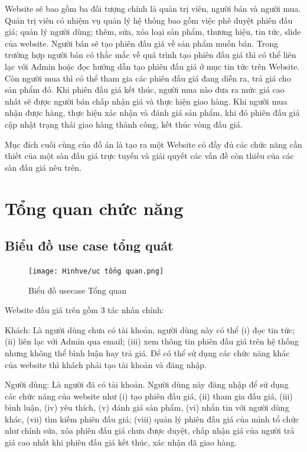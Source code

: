 \documentclass[../DoAn.tex]{subfiles}
\begin{document}
Website sẽ bao gồm ba đối tượng chính là quản trị viên, người bán và người mua. Quản trị viên có nhiệm vụ quản lý hệ thống bao gồm việc phê duyệt phiên đấu giá; quản lý người dùng; thêm, sửa, xóa loại sản phẩm, thương hiệu, tin tức, slide của website. Người bán sẽ tạo phiên đấu giá về sản phẩm muốn bán. Trong trường hợp người bán có thắc mắc về quá trình tạo phiên đấu giá thì có thể liên lạc với Admin hoặc đọc hướng dẫn tạo phiên đấu giá ở mục tin tức trên Website. Còn người mua thì có thể tham gia các phiên đấu giá đang diễn ra, trả giá cho sản phẩm đó. Khi phiên đấu giá kết thúc, người mua nào đưa ra mức giá cao nhất sẽ được người bán chấp nhận giá và thực hiện giao hàng. Khi người mua nhận được hàng, thực hiện xác nhận và đánh giá sản phẩm, khi đó phiên đấu giá cập nhật trạng thái giao hàng thành công, kết thúc vòng đấu giá.

Mục đích cuối cùng của đồ án là tạo ra một Website có đầy đủ các chức năng cần thiết của một sàn đấu giá trực tuyến và giải quyết các vấn đề còn thiếu của các sàn đấu giá nêu trên.
\section{Tổng quan chức năng}
\label{section:2.2}
\subsection{Biểu đồ use case tổng quát}
\label{subsection:2.2.1}
\begin{figure}[H]
    \centering
    \texttt{[image: Hinhve/uc tổng quan.png]}
    \caption{Biểu đồ usecase Tổng quan}
    \label{fig:Fig21}
\end{figure}
Website đấu giá trên gồm 3 tác nhân chính:

Khách: Là người dùng chưa có tài khoản, người dùng này có thể (i) đọc tin tức; (ii) liên lạc với Admin qua email; (iii) xem thông tin phiên đấu giá trên hệ thống nhưng không thể bình luận hay trả giá. Để có thể sử dụng các chức năng khác của website thì khách phải tạo tài khoản và đăng nhập.

Người dùng: Là người đã có tài khoản. Người dùng này đăng nhập để sử dụng các chức năng của website như (i) tạo phiên đấu giá, (ii) tham gia đấu giá, (iii) bình luận, (iv) yêu thích, (v) đánh giá sản phẩm, (vi) nhắn tin với người dùng khác, (vii) tìm kiếm phiên đấu giá; (viii) quản lý phiên đấu giá của mình tổ chức như chỉnh sửa, xóa phiên đấu giá chưa được duyệt, chấp nhận giá của người trả giá cao nhất khi phiên đấu giá kết thúc, xác nhận đã giao hàng.
\end{document}
